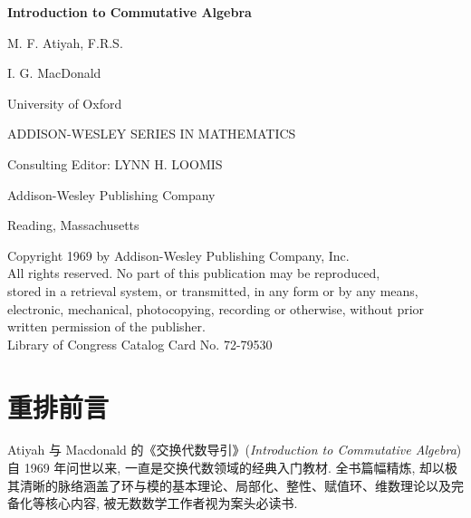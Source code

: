\documentclass[11pt,b5paper,openright,twoside]{book}
\theoremstyle{plain}
\theoremstyle{definition}
\theoremstyle{remark}
\begin{document}
\frontmatter
\begin{titlepage}
    \begin{center}
        \vspace*{2cm}
        {\Huge\bfseries Introduction to Commutative Algebra\par}
        \vspace{1.5cm}
        {\Large M. F. Atiyah, F.R.S.\par}
        \vspace{0.5cm}
        {\Large I. G. MacDonald\par}
        \vspace{0.5cm}
        {\large University of Oxford\par}
        
        \vfill
        
        {\large ADDISON-WESLEY SERIES IN MATHEMATICS\par}
        \vspace{0.5cm}
        {\large Consulting Editor: LYNN H. LOOMIS\par}
        
        \vfill
        
        {\large Addison-Wesley Publishing Company\par}
        {\large Reading, Massachusetts\par}
    \end{center}
\end{titlepage}

\thispagestyle{empty}

\begin{center}
    \small
    Copyright \textcopyright{} 1969 by Addison-Wesley Publishing Company, Inc.\\
    \vspace{0.5cm}
    All rights reserved. No part of this publication may be reproduced,\\
    stored in a retrieval system, or transmitted, in any form or by any means,\\
    electronic, mechanical, photocopying, recording or otherwise, without prior\\
    written permission of the publisher.\\
    \vspace{0.5cm}
    Library of Congress Catalog Card No. 72-79530
\end{center}

\newpage
\pagestyle{plain}           %
\chapter*{重排前言}
Atiyah 与 Macdonald 的《交换代数导引》(\textit{Introduction to Commutative Algebra}) 自 1969 年问世以来, 一直是交换代数领域的经典入门教材. 全书篇幅精炼, 却以极其清晰的脉络涵盖了环与模的基本理论、局部化、整性、赋值环、维数理论以及完备化等核心内容, 被无数数学工作者视为案头必读书. 
\end{document}
